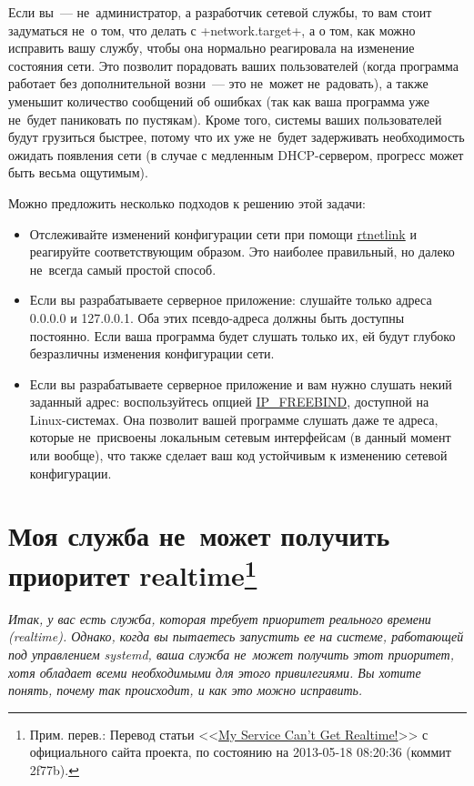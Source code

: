 \documentclass[10pt,oneside,a4paper]{article}
\newcommand{\sfnote}[1]{\texorpdfstring{\protect\footnote%
	{Прим. перев.: #1}}{}}
\newcommand\yousaywtf[1]{\emph{#1}}
\begin{document}
Если вы~--- не~администратор, а разработчик сетевой службы, то вам стоит
задуматься не~о том, что делать с +network.target+, а о том, как можно исправить
вашу службу, чтобы она нормально реагировала на изменение состояния сети. Это
позволит порадовать ваших пользователей (когда программа работает без
дополнительной возни~--- это не~может не~радовать), а также уменьшит количество
сообщений об ошибках (так как ваша программа уже не~будет паниковать по
пустякам). Кроме того, системы ваших пользователей будут грузиться быстрее,
потому что их уже не~будет задерживать необходимость ожидать появления сети (в
случае с медленным DHCP-сервером, прогресс может быть весьма ощутимым).

Можно предложить несколько подходов к решению этой задачи:
\begin{itemize}
	\item Отслеживайте изменений конфигурации сети при помощи
		\href{https://www.kernel.org/doc/man-pages/online/pages/man7/rtnetlink.7.html}%
		{rtnetlink} и реагируйте соответствующим образом. Это наиболее
		правильный, но далеко не~всегда самый простой способ.
	\item Если вы разрабатываете серверное приложение: слушайте только
		адреса 0.0.0.0 и 127.0.0.1. Оба этих псевдо-адреса должны быть
		доступны постоянно. Если ваша программа будет слушать только их,
		ей будут глубоко безразличны изменения конфигурации сети.
	\item Если вы разрабатываете серверное приложение и вам нужно слушать
		некий заданный адрес: воспользуйтесь опцией
		\href{https://www.kernel.org/doc/man-pages/online/pages/man7/ip.7.html}%
		{IP\_FREEBIND}, доступной на Linux-системах. Она позволит вашей
		программе слушать даже те адреса, которые не~присвоены локальным
		сетевым интерфейсам (в данный момент или вообще), что также
		сделает ваш код устойчивым к изменению сетевой конфигурации.
\end{itemize}

\section{Моя служба не~может получить приоритет realtime\sfnote{Перевод статьи
<<\href{http://www.freedesktop.org/wiki/Software/systemd/MyServiceCantGetRealtime}%
{My Service Can't Get Realtime!}>> с официального сайта проекта, по состоянию на
2013-05-18 08:20:36 (коммит 2f77b).}}
\label{sec:realtime}

\yousaywtf{Итак, у вас есть служба, которая требует приоритет реального времени
(realtime). Однако, когда вы пытаетесь запустить ее на системе, работающей под
управлением systemd, ваша служба не~может получить этот приоритет, хотя обладает
всеми необходимыми для этого привилегиями. Вы хотите понять, почему так
происходит, и как это можно исправить.}
\end{document}
